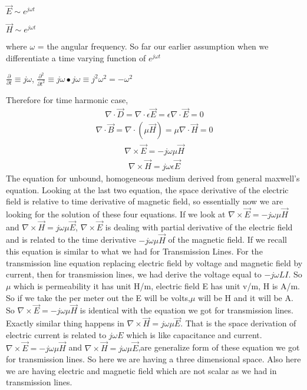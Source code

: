 $\vec{E} \sim e^{j\omega t}$

$\vec{H} \sim e^{j\omega t}$

where 
$\omega$ = the angular frequency.
So far our earlier assumption when we differentiate a time varying function of  $e^{j\omega t}$

$\frac{\partial}{\partial t} \equiv j\omega$,  
$\frac{\partial^2}{\partial t^2} \equiv j\omega \bullet j\omega \equiv j^2\omega^2=-\omega^2$

Therefore for time harmonic case,
\begin{align}
\nabla\cdot\vec{D}=\nabla\cdot \epsilon \vec{E}=\epsilon \nabla\cdot\vec{E}=0
\end{align}
\begin{align}
\nabla\cdot\vec{B}=\nabla\cdot (\mu\vec{H})=\mu \nabla\cdot\vec{H}=0
\end{align}
\begin{align}
\nabla \times \vec{E}=-j\omega\mu\vec{H}
\end{align}
\begin{align}
\nabla\times\vec{H}=j\omega\epsilon\vec{E}
\end{align}
The equation for unbound, homogeneous medium derived from general maxwell's equation. Looking at the last two equation, the space derivative of the electric field is relative to time derivative of magnetic field, so essentially now we are looking for the solution of these four equations. If we look  at $\nabla\times\vec{E}=-j\omega\mu\vec{H}$ and $\nabla\times\vec{H}=j\omega\mu\vec{E}$, $\nabla\times\vec{E}$ is dealing with partial derivative of the electric field and is related to the time derivative $-j\omega\mu\vec{H}$ of the magnetic field. If we recall this equation is similar to what we had for Transmission Lines. For the transmission line equation replacing electric field by voltage and magnetic field by current, then for transmission lines, we had derive the voltage equal to $-j\omega LI$. So $\mu$ which is permeability it has unit H/m, electric field E has unit v/m, H is A/m. So if we take the per meter out the E will be volts,$\mu$ will be H and it will be A. So $\nabla\times\vec{E}=-j\omega\mu\vec{H}$ is identical with the equation we got for transmission lines. Exactly similar thing happens in $\nabla\times\vec{H}=j\omega\mu\vec{E}$. That is the space derivation of electric current is related to $j\omega E$ which is like capacitance and current. $\nabla\times\vec{E}=-j\omega\mu\vec{H}$ and $\nabla\times\vec{H}=j\omega\mu\vec{E}$,are generalize form of these equation we got for transmission lines. So here we are having a three dimensional space. Also here we are having electric and magnetic field which are not scalar as we had in transmission lines.


